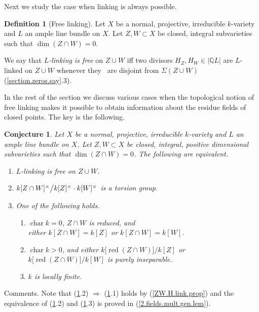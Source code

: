\documentclass{amsart}
\newtheorem{conj}[thm]{Conjecture}
\theoremstyle{definition}
\newtheorem{defn}[thm]{Definition}
\theoremstyle{remark}
\newcommand{\q}[0]{{\mathbb Q}}
\newcommand{\red}[0]{\operatorname{red}}
\newcommand{\chr}[0]{\operatorname{char}}
\begin{document}
Next we study the case when linking is always possible.


\begin{defn}[Free linking]\label{ZW.H.link.defn}
Let $X$ be a  normal, projective, irreducible  $k$-variety and
$L$  an ample line bundle  on $X$.
Let $Z, W\subset X$ be closed, integral  subvarieties
such that $\dim (Z\cap W)=0$.   

We say that {\it $L$-linking is free} on $Z\cup W$ iff
  two divisors $H_Z, H_W\in |\q L|$ are $L$-linked on $Z\cup W$ whenever they  \
are disjoint from $\Sigma(Z\cup W)$ (\ref{section.zeros.say}.3).
\end{defn}

In the rest of the section we discuss various cases when  the topological notion of free linking makes it possible to obtain information about the residue fields of closed points. 
The key is the following.


\begin{conj}\label{ZW.H.link.defn.conj}
Let $X$ be a  normal, projective, irreducible  $k$-variety and
$L$  an ample line bundle  on $X$.
Let $Z, W\subset X$ be closed, integral, positive dimensional  subvarieties
such that $\dim (Z\cap W)=0$.   The following are equivalent.
\begin{enumerate}
\item $L$-linking is  free  on $Z\cup W$. 
\item $k[Z\cap W]^\times\bigl\slash k[Z]^\times\cdot k[W]^\times$ is a torsion group.
\item One of the following holds.
\begin{enumerate}
\item $\chr k=0$,  $Z\cap W$ is  reduced, and \\
either $ k[Z\cap W]=k[Z]$ or $k[Z\cap W]=k[W]$.
\item $\chr k> 0$, and   either  $k\bigl[\red(Z\cap W)\bigr]/k[Z]$ 
or $k\bigl[\red(Z\cap W)\bigr]/k[W]$ is purely inseparable.
\item  $k$ is locally finite.
\end{enumerate}
\end{enumerate}
\end{conj}

Comments. Note  that (\ref{ZW.H.link.defn.conj}.2) $\Rightarrow$ (\ref{ZW.H.link.defn.conj}.1) holds by (\ref{ZW.H.link.prop})
and the equivalence of (\ref{ZW.H.link.defn.conj}.2) and (\ref{ZW.H.link.defn.conj}.3) is proved in  (\ref{2.fields.mult.gen.lem}).
\end{document}
